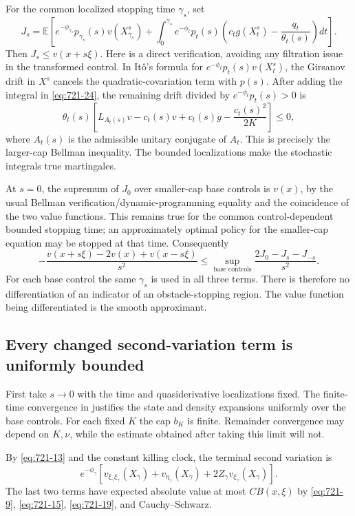 \documentclass[11pt,a4paper]{article}
\theoremstyle{remark}
\begin{document}
For the common localized stopping time $\gamma_s$, set
\begin{equation}
 J_s=\mathbb E\left[
 e^{-\phi_{\gamma_s}}p_{\gamma_s}(s)v(X_{\gamma_s}^s)
 +\int_0^{\gamma_s}e^{-\phi_t}p_t(s)
       \left(c_tg(X_t^s)-\frac{q_t}{\theta_t(s)}\right)dt
 \right].
 \label{eq:721-24}
\end{equation}
Then $J_s\le v(x+s\xi)$.  Here is a direct verification, avoiding any
filtration issue in the transformed control.  In It\^o's formula for
$e^{-\phi_t}p_t(s)v(X_t^s)$, the Girsanov drift in $X^s$ cancels the
quadratic-covariation term with $p(s)$.  After adding the integral in
\eqref{eq:721-24}, the remaining drift divided by $e^{-\phi_t}p_t(s)>0$ is
\[
 \theta_t(s)\left[
 L_{A_t(s)}v-c_t(s)v+c_t(s)g-\frac{c_t(s)^2}{2K}
 \right]\le0,
\]
where $A_t(s)$ is the admissible unitary conjugate of $A_t$.
This is precisely the larger-cap Bellman inequality.
The bounded localizations make the stochastic integrals true martingales.

At $s=0$, the supremum of $J_0$ over smaller-cap base controls is $v(x)$,
by the usual Bellman verification/dynamic-programming equality and the
coincidence of the two value functions.  This remains true for the common
control-dependent bounded stopping time; an approximately optimal policy
for the smaller-cap equation may be stopped at that time.
Consequently
\begin{equation}
 -\frac{v(x+s\xi)-2v(x)+v(x-s\xi)}{s^2}
 \le\sup_{\text{base controls}}
       \frac{2J_0-J_s-J_{-s}}{s^2}.
 \label{eq:721-25}
\end{equation}
For each base control the same $\gamma_s$ is used in all three terms.  There
is therefore no differentiation of an indicator of an obstacle-stopping
region.  The value function being differentiated is the smooth approximant.

\subsection{Every changed second-variation term is uniformly bounded}

First take $s\to0$ with the time and quasiderivative localizations fixed.
The finite-time convergence in \cite[Lemmas 6.2--6.3]{ZhouBellman2015}
justifies the state and density expansions uniformly over the base controls.
For each fixed $K$ the cap $b_K$ is finite.  Remainder convergence may depend
on $K,\nu$, while the estimate obtained after taking this limit will not.

By \eqref{eq:721-13} and the constant killing clock, the terminal second variation is
\begin{equation}
 e^{-\phi_\gamma}\left[
 v_{\xi_\gamma\xi_\gamma}(X_\gamma)
 +v_{\eta_\gamma}(X_\gamma)
 +2Z_\gamma v_{\xi_\gamma}(X_\gamma)
 \right].
 \label{eq:721-26}
\end{equation}
The last two terms have expected absolute value at most $CB(x,\xi)$ by
\eqref{eq:721-9}, \eqref{eq:721-15}, \eqref{eq:721-19}, and Cauchy--Schwarz.
\end{document}
